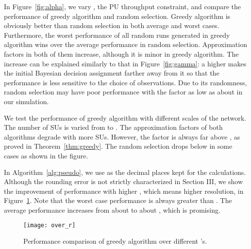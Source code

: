 \documentclass[conference]{IEEEtran}
\begin{document}
\begin{figure*}[!t]
\centering
{}
\hfil
{}
\hfil
{}
\vspace{-1em}
\caption{Performance comparison of greedy algorithm and random selection.}
\vspace{-1.5em}
\label{fig:gaN}
\end{figure*}

In Figure~\ref{fig:alpha}, we vary , the PU throughput constraint, and compare the performance of greedy algorithm and random selection. Greedy algorithm is obviously better than random selection in both average and worst cases. Furthermore, the worst performance of all random runs generated in greedy algorithm wins over the average performance in random selection. Approximation factors in both of them increase, although it is minor in greedy algorithm. The increase can be explained similarly to that in Figure~\ref{fig:gamma}: a higher  makes the initial Bayesian decision assignment farther away from it so that the performance is less sensitive to the choice of observations. Due to its randomness, random selection may have poor performance with the factor as low as about  in our simulation. 

We test the performance of greedy algorithm with different scales of the network. The number of SUs is varied from  to . The approximation factors of both algorithms degrade with more SUs. However, the factor is always far above , as proved in Theorem~\ref{thm:greedy}. The random selection drops below  in some cases as shown in the figure.   

In Algorithm~\ref{alg:pseudo}, we use  as the decimal places kept for the calculations. Although the rounding error is not strictly characterized in Section III, we show the improvement of performance with higher , which means higher resolution, in Figure~\ref{fig:r}. Note that the worst case performance is always greater than . The average performance increases from about  to about , which is promising.   

\begin{figure}[tb]
    \begin{center}
    \setlength{\unitlength}{1in}
    \texttt{[image: over\_r]}
    \end{center}
\vspace{-1.5em}
\caption{Performance comparison of greedy algorithm over different 's.}
\vspace{-1.2em}
\label{fig:r}
\end{figure}
\end{document}
